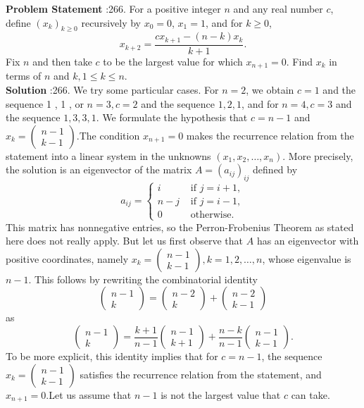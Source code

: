 \documentclass[10pt]{article}
\begin{document}
\textbf{Problem Statement} :266. For a positive integer $n$ and any real number $c$, define $\left(x_{k}\right)_{k \geq 0}$ recursively by $x_{0}=0$, $x_{1}=1$, and for $k \geq 0$,$$ x_{k+2}=\frac{c x_{k+1}-(n-k) x_{k}}{k+1} . $$Fix $n$ and then take $c$ to be the largest value for which $x_{n+1}=0$. Find $x_{k}$ in terms of $n$ and $k, 1 \leq k \leq n$.\\
\textbf{Solution} :266. We try some particular cases. For $n=2$, we obtain $c=1$ and the sequence 1 , 1 , or $n=3, c=2$ and the sequence $1,2,1$, and for $n=4, c=3$ and the sequence $1,3,3,1$. We formulate the hypothesis that $c=n-1$ and $x_{k}=\left(\begin{array}{c}n-1 \\ k-1\end{array}\right)$.The condition $x_{n+1}=0$ makes the recurrence relation from the statement into a linear system in the unknowns $\left(x_{1}, x_{2}, \ldots, x_{n}\right)$. More precisely, the solution is an eigenvector of the matrix $A=\left(a_{i j}\right)_{i j}$ defined by$$ a_{i j}= \begin{cases}i & \text { if } j=i+1, \\ n-j & \text { if } j=i-1, \\ 0 & \text { otherwise. }\end{cases} $$This matrix has nonnegative entries, so the Perron-Frobenius Theorem as stated here does not really apply. But let us first observe that $A$ has an eigenvector with positive coordinates, namely $x_{k}=\left(\begin{array}{c}n-1 \\ k-1\end{array}\right), k=1,2, \ldots, n$, whose eigenvalue is $n-1$. This follows by rewriting the combinatorial identity$$ \left(\begin{array}{c} n-1 \\ k \end{array}\right)=\left(\begin{array}{c} n-2 \\ k \end{array}\right)+\left(\begin{array}{l} n-2 \\ k-1 \end{array}\right) $$as$$ \left(\begin{array}{c} n-1 \\ k \end{array}\right)=\frac{k+1}{n-1}\left(\begin{array}{c} n-1 \\ k+1 \end{array}\right)+\frac{n-k}{n-1}\left(\begin{array}{l} n-1 \\ k-1 \end{array}\right) . $$To be more explicit, this identity implies that for $c=n-1$, the sequence $x_{k}=\left(\begin{array}{l}n-1 \\ k-1\end{array}\right)$ satisfies the recurrence relation from the statement, and $x_{n+1}=0$.Let us assume that $n-1$ is not the largest value that $c$ can take. 
\end{document}

